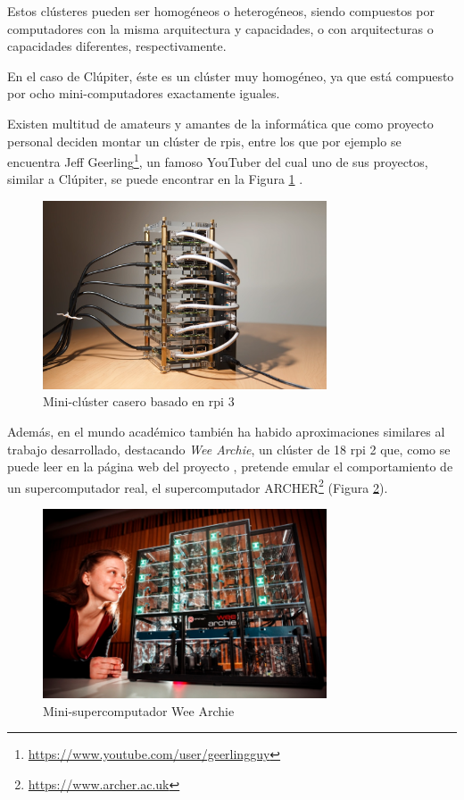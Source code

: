Estos clústeres pueden ser homogéneos o heterogéneos, siendo compuestos por computadores con la misma arquitectura y capacidades, o con arquitecturas o capacidades diferentes, respectivamente.

En el caso de Clúpiter, éste es un clúster muy homogéneo, ya que está compuesto por ocho mini-computadores exactamente iguales.

Existen multitud de amateurs y amantes de la informática que como proyecto personal deciden montar un clúster de \acrlong{rpi}s, entre los que por ejemplo se encuentra Jeff Geerling\footnote{\url{https://www.youtube.com/user/geerlingguy}}, un famoso YouTuber del cual uno de sus proyectos, similar a Clúpiter, se puede encontrar en la Figura \ref{fig:cluster-pi-ejemplo} \cite{geerling_intro_cluster}.

\begin{figure}[h!]
  \centering
  \includegraphics[width=0.75\textwidth]{img/cluster-pi-home.png}
  \caption{Mini-clúster casero basado en \acrlong{rpi} 3}
  \label{fig:cluster-pi-ejemplo}
\end{figure}

Además, en el mundo académico también ha habido aproximaciones similares al trabajo desarrollado, destacando \textit{Wee Archie}, un clúster de 18 \acrlong{rpi} 2 que, como se puede leer en la página web del proyecto \cite{wee_archie_webpage}, pretende emular el comportamiento de un supercomputador real, el supercomputador ARCHER\footnote{\url{https://www.archer.ac.uk}} (Figura \ref{fig:wee_archie_girl}).

\begin{figure}[h!]
  \centering
  \includegraphics[width=0.75\textwidth]{img/wee-girl.jpg}
  \caption{Mini-supercomputador Wee Archie}
  \label{fig:wee_archie_girl}
\end{figure}

